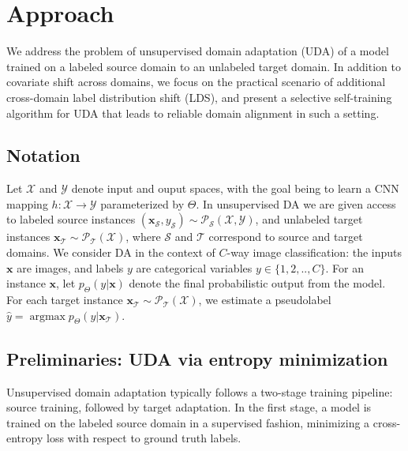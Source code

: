 \documentclass[10pt,twocolumn,letterpaper]{article}
\newcommand{\source}{\mathcal{S}}  \newcommand{\target}{\mathcal{T}}  \newcommand{\numsamples}{N}
\newcommand{\numclasses}{C}  \newcommand{\featext}{\phi}  \newcommand{\featsize}{D}  \newcommand{\model}{h}  \newcommand{\modelparams}{\Theta}  \newcommand{\timestep}{\rho}
\DeclareMathOperator*{\argmax}{argmax}
\begin{document}
\section{Approach}
\label{sec:approach}
\vspace{-3pt}

We address the problem of unsupervised domain adaptation (UDA) of a model trained on a labeled source domain to an unlabeled target domain. In addition to covariate shift across domains, we focus on the practical scenario of additional cross-domain label distribution shift (LDS), and present a selective self-training algorithm for UDA that leads to reliable domain alignment in such a setting.


\vspace{-2pt}
\subsection{Notation}
\vspace{-2pt}


\noindent Let $\mathcal{X}$ and $\mathcal{Y}$ denote input and ouput spaces, with the goal being to learn a CNN mapping $\model: \mathcal{X} \to \mathcal{Y}$ parameterized by $\modelparams$. In unsupervised DA we are given access to labeled source instances $(\mathbf{x}_\source, y_\source) \sim \mathcal{P}_\source(\mathcal{X}, \mathcal{Y})$, and unlabeled target instances $\mathbf{x}_\target \sim \mathcal{P}_\target(\mathcal{X})$, where $\source$ and $\target$ correspond to source and target domains. We consider DA in the context of $C$-way image classification: the inputs $\mathbf{x}$ are images, and labels $y$ are categorical variables $y \in \{1, 2, .. , \numclasses \}$. 
For an instance $\mathbf{x}$, let $p_{\modelparams}(y|\mathbf{x})$ denote the final probabilistic output from the model. For each target instance $\mathbf{x}_\target \sim \mathcal{P}_\target(\mathcal{X})$, we estimate a pseudolabel ${\hat{y}} = \argmax p_{\modelparams}(y | \mathbf{x}_\target)$.

\vspace{-2pt}
\subsection{Preliminaries: UDA via entropy minimization}
\vspace{-2pt}

Unsupervised domain adaptation typically follows a two-stage training pipeline: source training, followed by target adaptation. In the first stage, a model is trained on the labeled source domain in a supervised fashion, minimizing a cross-entropy loss with respect to ground truth labels.
\end{document}
